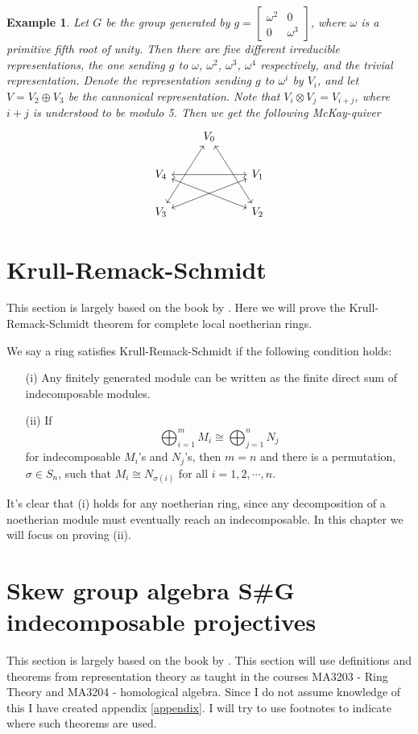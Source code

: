 \documentclass[11pt, a4paper, english]{article}
\numberwithin{prop}{section}
\numberwithin{lemma}{section}
\numberwithin{theorem}{section}
\numberwithin{defin}{section}
\newtheorem{example}{Example}
\numberwithin{example}{section}
\begin{document}
\begin{example}
Let $G$ be the group generated by $g =\begin{bmatrix}
\omega^2 & 0\\
0 & \omega^{3}
\end{bmatrix}$, where $\omega$ is a primitive fifth root of unity. Then there are five different irreducible representations, the one sending $g$ to $\omega$, $\omega^2$, $\omega^3$, $\omega^4$ respectively, and the trivial representation. Denote the representation sending $g$ to $\omega^i$ by $V_i$, and let $V = V_2 \oplus V_3$ be the cannonical representation. Note that $V_i \otimes V_j = V_{i+j}$, where $i+j$ is understood to be modulo 5. Then we get the following McKay-quiver
$$
\begin{tikzcd}
& V_0 \arrow[<->]{ddr} \arrow[<->]{ddl} & \\
V_4 && V_1 \arrow[<->]{ll}\arrow[<->]{dll}\\
V_3 && V_2 \arrow[<->]{ull}
\end{tikzcd}  
$$
\end{example}

\section{Krull-Remack-Schmidt}
This section is largely based on the book by \cite{CMR}.
Here we will prove the Krull-Remack-Schmidt theorem for complete local noetherian rings.

We say a ring satisfies Krull-Remack-Schmidt if the following condition holds:
\begin{itemize}
	\item[(i)] Any finitely generated module can be written as the finite direct sum of indecomposable modules.
	\item[(ii)] If $$\bigoplus_{i=1}^m M_i \cong \bigoplus_{j=1}^n N_j$$
	for indecomposable $M_i$'s and $N_j$'s, then $m=n$ and there is a permutation, $\sigma \in S_n$, such that $M_i \cong N_{\sigma(i)}$ for all $i=1,2, \cdots, n$.  
\end{itemize}

It's clear that (i) holds for any noetherian ring, since any decomposition of a noetherian module must eventually reach an indecomposable. In this chapter we will focus on proving (ii).

\section{Skew group algebra S\#G indecomposable projectives}
This section is largely based on the book by \cite{CMR}. This section will use definitions and theorems from representation theory as taught in the courses MA3203 - Ring Theory and MA3204 - homological algebra. Since I do not assume knowledge of this I have created appendix \ref{appendix}. I will try to use footnotes to indicate where such theorems are used.
\end{document}
